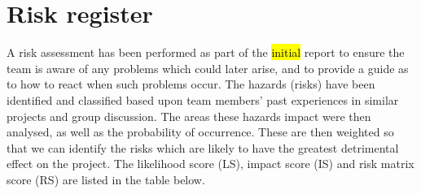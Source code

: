 \section{Risk register}
\label{sec:riskregister}

A risk assessment has been performed as part of the \hl{initial} report to ensure the team is aware of any problems which could later arise, and to provide a guide as to how to react when such problems occur. The hazards (risks) have been identified and classified based upon team members' past experiences in similar projects and group discussion. The areas these hazards impact were then analysed, as well as the probability of occurrence. These are then weighted so that we can identify the risks which are likely to have the greatest detrimental effect on the project. The likelihood score (LS), impact score (IS) and risk matrix score (RS) are listed in the table below.

